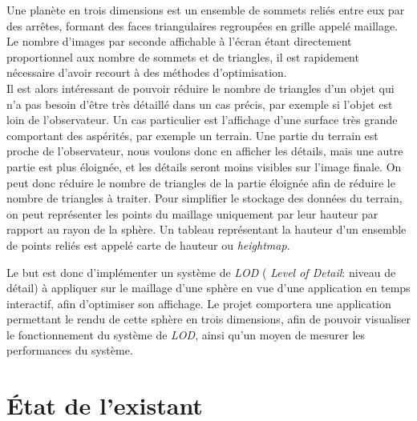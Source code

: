 \documentclass[12pt]{report}
\begin{document}
Une planète en trois dimensions est un ensemble de sommets reliés
entre eux par des arrêtes, formant des faces triangulaires regroupées en grille appelé maillage.\\
Le nombre d'images par seconde affichable à l'écran étant directement proportionnel aux nombre de sommets et de triangles, il est rapidement nécessaire d'avoir recourt à des méthodes d'optimisation.\\
Il est alors intéressant de pouvoir réduire le nombre de triangles d'un
objet qui n'a pas besoin d'être très détaillé dans un cas précis, par
exemple si l'objet est loin de l'observateur. Un cas particulier est
l'affichage d'une surface très grande comportant des aspérités, par
exemple un terrain. Une partie du terrain est proche de l'observateur,
nous voulons donc en afficher les détails, mais une autre partie est
plus éloignée, et les détails seront moins visibles sur l'image finale.
On peut donc réduire le nombre de triangles de la partie éloignée afin de
réduire le nombre de triangles à traiter. Pour simplifier le stockage
des données du terrain, on peut représenter les points du maillage
uniquement par leur hauteur par rapport au rayon de la sphère. Un
tableau représentant la hauteur d'un ensemble de points reliés est
appelé carte de hauteur ou \emph{heightmap}.

Le but est donc d'implémenter un système de \emph{LOD} (
\emph{Level of Detail}: niveau de détail) à appliquer sur le maillage
d'une sphère en vue d'une application en temps interactif, afin
d'optimiser son affichage. Le projet comportera une application
permettant le rendu de cette sphère en trois dimensions, afin de pouvoir
visualiser le fonctionnement du système de \emph{LOD}, ainsi qu'un moyen
de mesurer les performances du système.

\newpage

\chapter*{État de l'existant}
\setcounter{chapter}{2}
\end{document}
